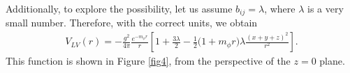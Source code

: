 \documentclass[11pt,showpacs,preprintnumbers,amsmath,amssymb,prd,nofootinbib,superscriptaddress]{revtex4-2}
\begin{document}
Additionally, to explore the possibility, let us assume $b_{ij} = \lambda$, where $\lambda$ is a very small number. Therefore, with the correct units, we obtain
\begin{eqnarray}
    V_{LV}(r)=-\frac{g^2}{4\pi}\frac{e^{-m_{\phi}r}}{r}\left[1+\frac{3\lambda}{2}-\frac{1}{2}\biggl(1+m_\phi r\biggr)\lambda\frac{(x+y+z)^2}{r^2}\right].\label{eq27}
\end{eqnarray}
This function is shown in Figure \ref{fig4}, from the perspective of the $z=0$ plane.
\begin{figure}[ht]
    \centering

\end{figure}
\end{document}
